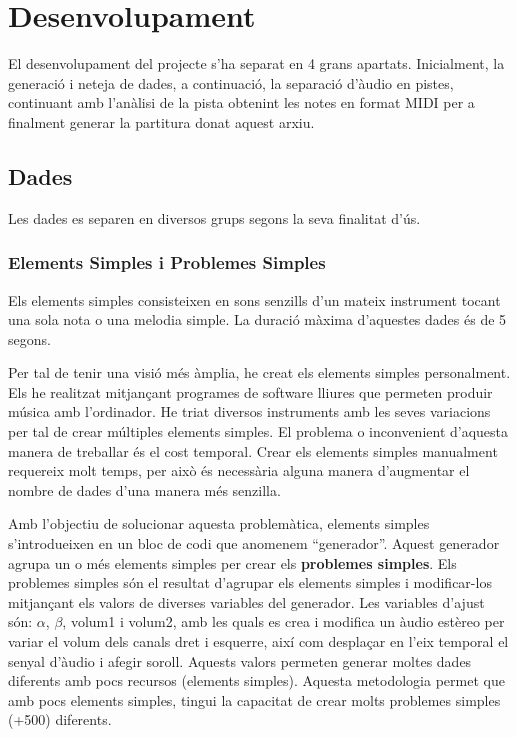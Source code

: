 \documentclass[10pt,a4paper,twocolumn,twoside]{article}
\begin{document}
\section{Desenvolupament}

El desenvolupament del projecte s'ha separat en 4 grans apartats. Inicialment, la generació i neteja de dades, a continuació, la separació d'àudio en pistes, continuant amb l'anàlisi de la pista obtenint les notes en format MIDI per a finalment generar la partitura donat aquest arxiu.

\subsection{Dades}

Les dades es separen en diversos grups segons la seva finalitat d'ús.

\subsubsection{Elements Simples i Problemes Simples}

Els elements simples consisteixen en sons senzills d'un mateix instrument tocant una sola nota o una melodia simple. La duració màxima d'aquestes dades és de 5 segons.

Per tal de tenir una visió més àmplia, he creat els elements simples personalment. Els he realitzat mitjançant programes de software lliures que permeten produir música amb l'ordinador. He triat diversos instruments amb les seves variacions per tal de crear múltiples elements simples.
El problema o inconvenient d'aquesta manera de treballar és el cost temporal. Crear els elements simples manualment requereix molt temps, per això és necessària alguna manera d'augmentar el nombre de dades d'una manera més senzilla.

Amb l'objectiu de solucionar aquesta problemàtica, elements simples s'introdueixen en un bloc de codi que anomenem ``generador''. Aquest generador agrupa un o més elements simples per crear els \textbf{problemes simples}. Els problemes simples són el resultat d'agrupar els elements simples i modificar-los mitjançant els valors de diverses variables del generador. Les variables d'ajust són: \(\alpha\), \(\beta\), volum1 i volum2, amb les quals es crea i modifica un àudio estèreo per variar el volum dels canals dret i esquerre, així com desplaçar en l'eix temporal el senyal d'àudio i afegir soroll. Aquests valors permeten generar moltes dades diferents amb pocs recursos (elements simples). 
Aquesta metodologia permet que amb pocs elements simples, tingui la capacitat de crear molts problemes simples (+500) diferents.
\end{document}
